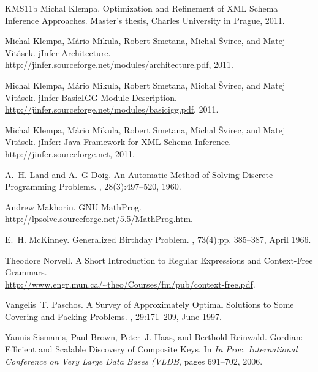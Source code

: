 \begin{thebibliography}{KMS{\etalchar{+}}11b}
Michal Klempa.
\newblock Optimization and Refinement of XML Schema Inference Approaches.
\newblock Master's thesis, Charles University in Prague, 2011.

Michal Klempa, M\'{a}rio Mikula, Robert Smetana, Michal \v{S}virec, and Matej Vit\'{a}sek.
\newblock jInfer Architecture.\\
\newblock \url{http://jinfer.sourceforge.net/modules/architecture.pdf}, 2011.

Michal Klempa, M\'{a}rio Mikula, Robert Smetana, Michal \v{S}virec, and Matej Vit\'{a}sek.
\newblock jInfer BasicIGG Module Description.\\
\newblock \url{http://jinfer.sourceforge.net/modules/basicigg.pdf}, 2011.

Michal Klempa, M\'{a}rio Mikula, Robert Smetana, Michal \v{S}virec, and Matej Vit\'{a}sek.
\newblock jInfer: Java Framework for XML Schema Inference.\\
\newblock \url{http://jinfer.sourceforge.net}, 2011.

A.~H. Land and A.~G Doig.
\newblock An Automatic Method of Solving Discrete Programming Problems.
, 28(3):497--520, 1960.

Andrew Makhorin.
\newblock GNU MathProg.
\newblock \url{http://lpsolve.sourceforge.net/5.5/MathProg.htm}.

E.~H. McKinney.
\newblock Generalized Birthday Problem.
, 73(4):pp. 385--387, April 1966.

Theodore Norvell.
\newblock A Short Introduction to Regular Expressions and Context-Free Grammars.\\
\newblock \url{http://www.engr.mun.ca/~theo/Courses/fm/pub/context-free.pdf}.

Vangelis~T. Paschos.
\newblock A Survey of Approximately Optimal Solutions to Some Covering and Packing Problems.
, 29:171--209, June 1997.

Yannis Sismanis, Paul Brown, Peter~J. Haas, and Berthold Reinwald.
\newblock Gordian: Efficient and Scalable Discovery of Composite Keys.
\newblock In {\em In Proc. International Conference on Very Large Data Bases (VLDB}, pages 691--702, 2006.


\end{thebibliography}
